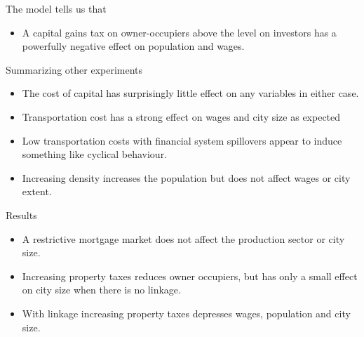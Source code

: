\documentclass[hide notes=show/only]{beamer} %
\begin{document}
\begin{frame}{The model tells us that}  \Large
\begin {itemize}[<+-|alert@+>]
\item  A capital gains tax on owner-occupiers above the level  on investors has a powerfully negative effect on population and wages.
\end{itemize}
\end{frame}

\begin{frame}{Summarizing other experiments} \Large
\begin {itemize}[<+-|alert@+>]

\item  The cost of capital has surprisingly little effect on any variables in either case.

\item  Transportation cost has a strong effect on wages and city size as expected 
 
\item Low transportation costs with financial system spillovers appear to induce something like cyclical behaviour.

\item  Increasing density increases the population but does not affect wages or city extent.
\end{itemize}
\end{frame}%

\begin{frame}{Results} \Large
\begin {itemize}[<+-|alert@+>]
\item A restrictive mortgage market does not affect the production sector or city size.

\item  Increasing property taxes reduces owner occupiers, but has only a small effect on city size when there is no linkage. 
 
\item  With linkage increasing property taxes depresses wages, population and city size.
\end{itemize}
\end{frame}%
\end{document}
